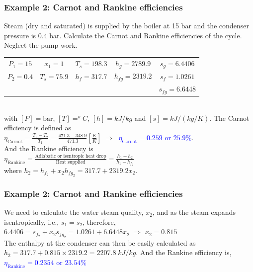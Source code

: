 \documentclass[10pt,compress]{beamer}
\begin{document}
\begin{frame}
 \frametitle{Example 2: Carnot and Rankine efficiencies}
Steam (dry and saturated) is supplied by the boiler at 15 bar and the condenser pressure is 0.4 bar. Calculate the Carnot and Rankine efficiencies of the cycle. Neglect the pump work.

\medskip

{\it
\begin{tabular}{c| c c c c}
\hline
 {\bf $P_{1}=15$}  & $x_{1}=1$                & $T_{s}=198.3$  & $h_{g}=2789.9$   & $s_{g}=6.4406$ \\ 
 {\bf $P_{2}=0.4$} & $T_{s}=75.9$             & $h_{f}=317.7$  & $h_{fg}=2319.2$  & $s_{f}=1.0261$  \\
                  &                          &                &                 & $s_{fg}=6.6448$ \\ 
\hline
\end{tabular}\\
with $[P]=\text{bar}$, $[T]=^{o}C$, $[h]=kJ/kg$ and $[s]=kJ/(kg/K)$. The Carnot efficiency is defined as \\
\medskip
$\eta_{\text{Carnot}}=\displaystyle\frac{T_{1}-T_{2}}{T_{1}}= \displaystyle\frac{471.3-348.9}{471.3}\left[\displaystyle\frac{K}{K}\right]\;\Longrightarrow\;$ \textcolor{blue}{$\eta_{\text{Carnot}}=0.259\text{ or }25.9\%$}.\\
\medskip
And the Rankine efficiency is \\
\medskip
 $\eta_{\text{Rankine}}=\displaystyle\frac{\text{Adiabatic or isentropic heat drop}}{\text{Heat supplied}}=\displaystyle\frac{h_{1}-h_{2}}{h_{1}-h_{f_{2}}}$\\
\medskip
where $h_{2}=h_{f_{2}}+x_{2}h_{fg_{2}}=317.7+2319.2x_{2}$. 
}
 \normalsize
\end{frame}


\begin{frame}
 \frametitle{Example 2: Carnot and Rankine efficiencies}

{\it 

\medskip 
We need to calculate the water steam quality, $x_{2}$, and as the steam expands isentropically, i.e., $s_{1}=s_{2}$, therefore,\\
\medskip
$6.4406=s_{f_{2}}+x_{2}s_{fg_{2}}=1.0261+6.6448x_{2}$ $\Longrightarrow$ $x_{2}=0.815$\\
\medskip
The enthalpy at the condenser can then be easily calculated as $h_{2}=317.7+0.815\times 2319.2=2207.8\;kJ/kg$. And the Rankine efficiency is,\\
\medskip
\textcolor{blue}{$\eta_{\text{Rankine}}=0.2354\text{ or }23.54\%$}
}

\normalsize
\end{frame}
\end{document}
